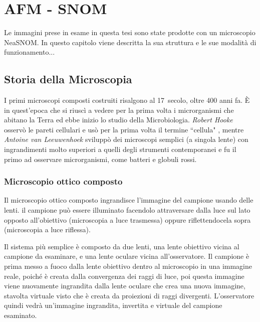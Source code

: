 \documentclass[../main.tex]{subfiles}
\begin{document}
\chapter{AFM - SNOM}
Le immagini prese in esame in questa tesi sono state prodotte con un microscopio NeaSNOM. In questo capitolo viene descritta la sua struttura e le sue modalità di funzionamento...
\section{Storia della Microscopia}

I primi microscopi composti costruiti risalgono al 17\textdegree\ secolo, oltre 400 anni fa. È in quest'epoca che si riuscì a vedere per la prima volta i microrganismi che abitano la Terra ed ebbe inizio lo studio della Microbiologia. \textit{Robert Hooke} osservò le pareti cellulari e usò per la prima volta il termine ``cellula" \cite{fara_2009, micrographia}, mentre \textit{Antoine van Leeuwenhoek} sviluppò dei microscopi semplici (a singola lente) con ingrandimenti molto superiori a quelli degli strumenti contemporanei e fu il primo ad osservare microrganismi, come batteri e globuli rossi.\cite{lane_2015, dobell_1923, corliss_1975, jessup_2024}

\subsection{Microscopio ottico composto}

Il microscopio ottico composto ingrandisce l'immagine del campione usando delle lenti. il campione può essere illuminato facendolo attraversare dalla luce sul lato opposto all'obiettivo (microscopia a luce trasmessa) oppure riflettendocela sopra (microscopia a luce riflessa).

Il sistema più semplice è composto da due lenti, una lente obiettivo vicina al campione da esaminare, e una lente oculare vicina all'osservatore. Il campione è prima messo a fuoco dalla lente obiettivo dentro al microscopio in una immagine reale, poiché è creata dalla convergenza dei raggi di luce, poi questa immagine viene nuovamente ingrandita dalla lente oculare che crea una nuova immagine, stavolta virtuale visto che è creata da proiezioni di raggi divergenti. L'osservatore quindi vedrà un'immagine ingrandita, invertita e virtuale del campione esaminato.
\end{document}
